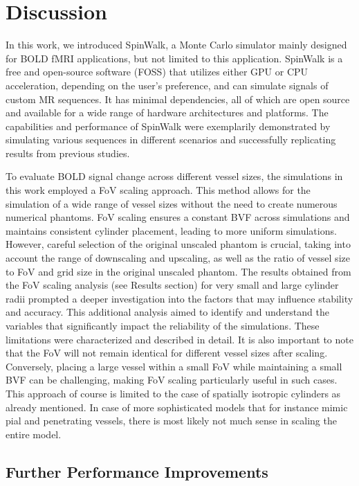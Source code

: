 \section{Discussion}

In this work, we introduced SpinWalk, a Monte Carlo simulator mainly designed for BOLD fMRI applications, but not limited to this application. SpinWalk is a free and open-source software (FOSS) that utilizes either GPU or CPU acceleration, depending on the user's preference, and can simulate signals of custom MR sequences. It has minimal dependencies, all of which are open source and available for a wide range of hardware architectures and platforms. The capabilities and performance of SpinWalk were exemplarily demonstrated by simulating various sequences in different scenarios and successfully replicating results from previous studies.

To evaluate BOLD signal change across different vessel sizes, the simulations in this work employed a FoV scaling approach. This method allows for the simulation of a wide range of vessel sizes without the need to create numerous numerical phantoms. FoV scaling ensures a constant BVF across simulations and maintains consistent cylinder placement, leading to more uniform simulations. However, careful selection of the original unscaled phantom is crucial, taking into account the range of downscaling and upscaling, as well as the ratio of vessel size to FoV and grid size in the original unscaled phantom. The results obtained from the FoV scaling analysis (see Results section) for very small and large cylinder radii prompted a deeper investigation into the factors that may influence stability and accuracy. This additional analysis aimed to identify and understand the variables that significantly impact the reliability of the simulations. These limitations were characterized and described in detail. It is also important to note that the FoV will not remain identical for different vessel sizes after scaling. Conversely, placing a large vessel within a small FoV while maintaining a small BVF can be challenging, making FoV scaling particularly useful in such cases. This approach of course is limited to the case of spatially isotropic cylinders as already mentioned. In case of more sophisticated models that for instance mimic pial and penetrating vessels, there is most likely not much sense in scaling the entire model.


\subsection{Further Performance Improvements}

